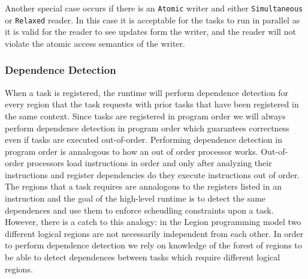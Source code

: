 Another special case occurs if there is an {\tt Atomic} writer and either {\tt Simultaneous}
or {\tt Relaxed} reader.  In this case it is acceptable for the tasks to run in
parallel as it is valid for the reader to see updates form the writer, and the
reader will not violate the atomic access semantics of the writer.



\subsubsection{Dependence Detection}
\label{subsec:depdetect}
When a task is registered, the runtime
will perform dependence detection for every region that the task requests with
prior tasks that have been registered in the same context.  Since
tasks are registered in program order we will always perform dependence detection
in program order which guarantees correctness even if tasks are executed out-of-order.  
Performing dependence detection in program order is annalogous to how an out of order
processor works.  Out-of-order processors load instructions in order and only after
analyzing their instructions and register dependencies do they execute instructions
out of order.  The regions that a task requires are annalogous
to the registers listed in an instruction and the goal of the high-level
runtime is to detect the same dependences and use them to enforce scheudling constraints
upon a task.  However, there is a catch to this analogy: in the Legion programming
model two different logical regions are not necessarily independent from each other.  In
order to perform dependence detection we rely on knowledge of the forest of regions to be
able to detect dependences between tasks which require different logical regions.

